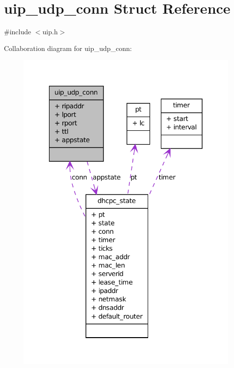 \hypertarget{structuip__udp__conn}{
\section{uip\_\-udp\_\-conn Struct Reference}
\label{structuip__udp__conn}
}


{\ttfamily \#include $<$uip.h$>$}



Collaboration diagram for uip\_\-udp\_\-conn:
\nopagebreak
\begin{figure}[H]
\begin{center}
\leavevmode
\includegraphics[width=313pt]{structuip__udp__conn__coll__graph}
\end{center}
\end{figure}
